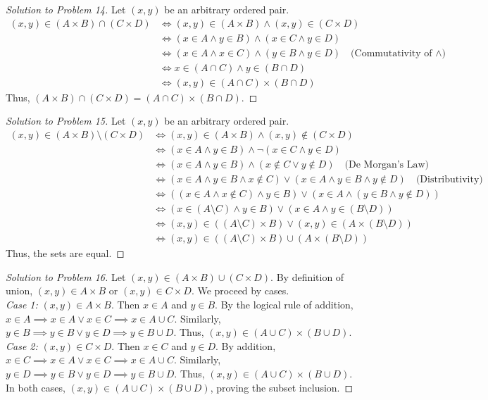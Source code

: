 \documentclass[11pt]{article}
\begin{document}
\begin{proof}[Solution to Problem 14]
Let $(x,y)$ be an arbitrary ordered pair.
\begin{align*}
(x,y) \in (A \times B) \cap (C \times D) &\iff (x,y) \in (A \times B) \land (x,y) \in (C \times D) \\
&\iff (x \in A \land y \in B) \land (x \in C \land y \in D) \\
&\iff (x \in A \land x \in C) \land (y \in B \land y \in D) \quad \text{(Commutativity of } \land) \\
&\iff x \in (A \cap C) \land y \in (B \cap D) \\
&\iff (x,y) \in (A \cap C) \times (B \cap D)
\end{align*}
Thus, $(A \times B) \cap (C \times D) = (A \cap C) \times (B \cap D)$.
\end{proof}

\begin{proof}[Solution to Problem 15]
Let $(x,y)$ be an arbitrary ordered pair.
\begin{align*}
(x,y) \in (A \times B) \setminus (C \times D) &\iff (x,y) \in (A \times B) \land (x,y) \notin (C \times D) \\
&\iff (x \in A \land y \in B) \land \neg(x \in C \land y \in D) \\
&\iff (x \in A \land y \in B) \land (x \notin C \lor y \notin D) \quad \text{(De Morgan's Law)} \\
&\iff (x \in A \land y \in B \land x \notin C) \lor (x \in A \land y \in B \land y \notin D) \quad \text{(Distributivity)} \\
&\iff ((x \in A \land x \notin C) \land y \in B) \lor (x \in A \land (y \in B \land y \notin D)) \\
&\iff (x \in (A \setminus C) \land y \in B) \lor (x \in A \land y \in (B \setminus D)) \\
&\iff (x,y) \in ((A \setminus C) \times B) \lor (x,y) \in (A \times (B \setminus D)) \\
&\iff (x,y) \in ((A \setminus C) \times B) \cup (A \times (B \setminus D))
\end{align*}
Thus, the sets are equal.
\end{proof}

\begin{proof}[Solution to Problem 16]
Let $(x,y) \in (A \times B) \cup (C \times D)$. By definition of union, $(x,y) \in A \times B$ or $(x,y) \in C \times D$. We proceed by cases. \\
\textit{Case 1:} $(x,y) \in A \times B$. Then $x \in A$ and $y \in B$. By the logical rule of addition, $x \in A \implies x \in A \lor x \in C \implies x \in A \cup C$. Similarly, $y \in B \implies y \in B \lor y \in D \implies y \in B \cup D$. Thus, $(x,y) \in (A \cup C) \times (B \cup D)$. \\
\textit{Case 2:} $(x,y) \in C \times D$. Then $x \in C$ and $y \in D$. By addition, $x \in C \implies x \in A \lor x \in C \implies x \in A \cup C$. Similarly, $y \in D \implies y \in B \lor y \in D \implies y \in B \cup D$. Thus, $(x,y) \in (A \cup C) \times (B \cup D)$. \\
In both cases, $(x,y) \in (A \cup C) \times (B \cup D)$, proving the subset inclusion.
\end{proof}
\end{document}
